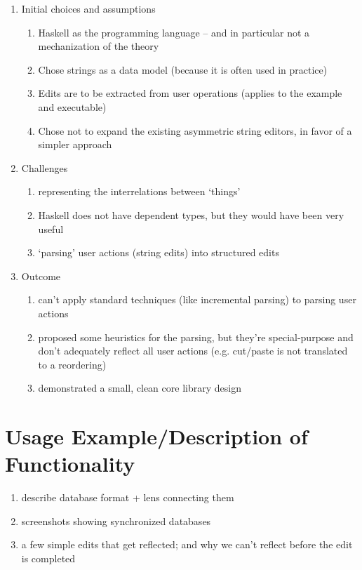 \begin{enumerate}
    \item Initial choices and assumptions
        \begin{enumerate}
            \item Haskell as the programming language -- and in particular not a mechanization of the theory
            \item Chose strings as a data model (because it is often used in practice)
            \item Edits are to be extracted from user operations (applies to the example and executable)
            \item Chose not to expand the existing asymmetric string editors, in favor of a simpler approach
        \end{enumerate}
    \item Challenges
        \begin{enumerate}
            \item representing the interrelations between `things'
            \item Haskell does not have dependent types, but they would have been very useful
            \item `parsing' user actions (string edits) into structured edits
        \end{enumerate}
    \item Outcome
        \begin{enumerate}
            \item can't apply standard techniques (like incremental parsing) to parsing user actions
            \item proposed some heuristics for the parsing, but they're special-purpose and don't adequately reflect all user actions (e.g. cut/paste is not translated to a reordering)
            \item demonstrated a small, clean core library design
        \end{enumerate}
\end{enumerate}

\section{Usage Example/Description of Functionality}
\label{sec:impl-usage}
\begin{enumerate}
    \item describe database format + lens connecting them
    \item screenshots showing synchronized databases
    \item a few simple edits that get reflected; and why we can't reflect before the edit is completed
\end{enumerate}

